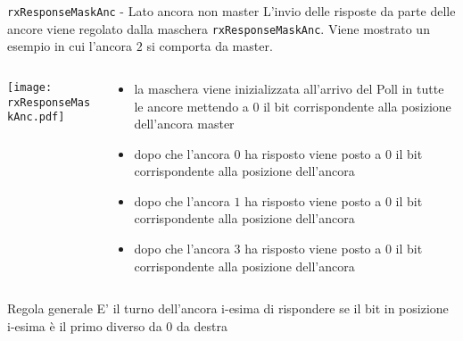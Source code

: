 \begin{frame}[shrink=10]{\lstinline!rxResponseMaskAnc! - Lato ancora \alert{non} master}
  L'invio delle risposte da parte delle ancore viene regolato dalla maschera \lstinline!rxResponseMaskAnc!.
  Viene mostrato un esempio in cui l'ancora $2$ si comporta da master.
  \begin{columns}
    \begin{column}{0.4\textwidth}
      \begin{center}
        \texttt{[image: rxResponseMaskAnc.pdf]}
      \end{center}
    \end{column}
    \begin{column}{0.7\textwidth}
      \begin{itemize}
      \item[1)] la maschera viene inizializzata all'arrivo del Poll in tutte le ancore mettendo a $0$ il bit corrispondente alla posizione dell'ancora master
      \item[2)] dopo che l'ancora $0$ ha risposto viene posto a $0$ il bit corrispondente alla posizione dell'ancora 
      \item[3)] dopo che l'ancora $1$ ha risposto viene posto a $0$ il bit corrispondente alla posizione dell'ancora 
      \item[4)] dopo che l'ancora $3$ ha risposto viene posto a $0$ il bit corrispondente alla posizione dell'ancora 
      \end{itemize}
    \end{column}
  \end{columns}
  \begin{exampleblock}{Regola generale}
    E' il turno dell'ancora i-esima di rispondere se il bit in posizione i-esima è il primo diverso da $0$ da destra 
  \end{exampleblock}
\end{frame}

